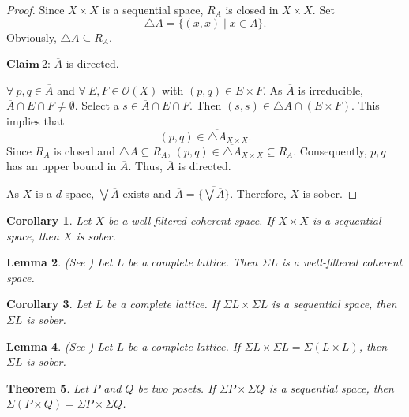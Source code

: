 \documentclass[preprint,12pt]{elsarticle}
\numberwithin{equation}{section}
\newtheorem{theorem}{Theorem}[section]
\newtheorem{lemma}[theorem]{Lemma}
\newtheorem{corollary}[theorem]{Corollary}
\begin{document}
\begin{proof}
Since $X\times X$ is a sequential space, $R_{A}$ is closed in $X\times X$. Set
$$\bigtriangleup A=\{(x,x)\mid x\in A\}.$$ Obviously, $\bigtriangleup A\subseteq R_{A}$.

$\mathbf{Claim}\ 2$: $\overline{A}$ is directed.


$\forall\ p,q\in \overline{A}$ and $\forall\ E,F\in\mathcal{O}(X)$ with $(p,q)\in E\times F$. As $\overline{A}$ is irreducible, $\overline{A}\cap E\cap F\neq\emptyset$. Select a $s\in \overline{A}\cap E\cap F$. Then $(s,s)\in \bigtriangleup A\cap (E\times F)$. This implies that $$(p,q)\in\overline{\bigtriangleup A}_{X\times X}.$$  Since $R_{A}$ is closed and $\bigtriangleup A\subseteq R_{A}$, $(p,q)\in\overline{\bigtriangleup A}_{X\times X}\subseteq R_{A}$. Consequently, $p,q$ has an upper bound in $\overline{A}$. Thus, $\overline{A}$ is directed.

As $X$ is a $d$-space, $\bigvee \overline{A}$ exists and $\overline{A}=\overline{\{\bigvee \overline{A}\}}$. Therefore, $X$ is sober.
\end{proof}

\begin{corollary} {\rm Let $X$ be a well-filtered coherent space. If $X\times X$ is a sequential space, then $X$ is sober.}
\end{corollary}

\begin{lemma} {\rm (See \cite{XLOP17}) Let $L$ be a complete lattice. Then $\Sigma L$ is a well-filtered coherent space.}
\end{lemma}

\begin{corollary}{\rm Let $L$ be a complete lattice. If $\Sigma L\times \Sigma L$ is a sequential space, then $\Sigma L$ is sober.}
\end{corollary}


\begin{lemma}{\rm(See \cite{GG03}) Let $L$ be a complete lattice. If $\Sigma L\times\Sigma L=\Sigma(L\times L)$, then $\Sigma L$ is sober.}
\end{lemma}

\begin{theorem} {\rm Let $P$ and $Q$ be two posets. If $\Sigma P\times \Sigma Q$ is a sequential  space, then $\Sigma (P\times Q)=\Sigma P \times \Sigma Q$.}
\end{theorem}
\end{document}

